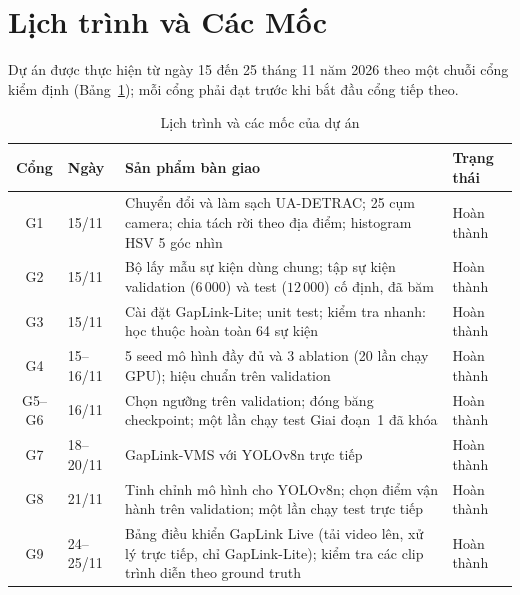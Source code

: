 \section{Lịch trình và Các Mốc}
\label{sec:schedule_milestones}

Dự án được thực hiện từ ngày 15 đến 25 tháng 11 năm 2026 theo một chuỗi cổng kiểm định (Bảng~\ref{tab:milestones}); mỗi cổng phải đạt trước khi bắt đầu cổng tiếp theo.

\begin{table}[H]
    \centering
    \caption{Lịch trình và các mốc của dự án}
    \label{tab:milestones}
    \small
    \begin{tabularx}{\textwidth}{c p{1.6cm} X p{1.9cm}}
        \toprule
        \textbf{Cổng} & \textbf{Ngày} & \textbf{Sản phẩm bàn giao} & \textbf{Trạng thái} \\
        \midrule
        G1 & 15/11 & Chuyển đổi và làm sạch UA-DETRAC; 25 cụm camera; chia tách rời theo địa điểm; histogram HSV 5 góc nhìn & Hoàn thành \\
        G2 & 15/11 & Bộ lấy mẫu sự kiện dùng chung; tập sự kiện validation ($6\,000$) và test ($12\,000$) cố định, đã băm & Hoàn thành \\
        G3 & 15/11 & Cài đặt GapLink-Lite; unit test; kiểm tra nhanh: học thuộc hoàn toàn 64 sự kiện & Hoàn thành \\
        G4 & 15--16/11 & 5 seed mô hình đầy đủ và 3 ablation (20 lần chạy GPU); hiệu chuẩn trên validation & Hoàn thành \\
        G5--G6 & 16/11 & Chọn ngưỡng trên validation; đóng băng checkpoint; một lần chạy test Giai đoạn~1 đã khóa & Hoàn thành \\
        G7 & 18--20/11 & GapLink-VMS với YOLOv8n trực tiếp & Hoàn thành \\
        G8 & 21/11 & Tinh chỉnh mô hình cho YOLOv8n; chọn điểm vận hành trên validation; một lần chạy test trực tiếp & Hoàn thành \\
        G9 & 24--25/11 & Bảng điều khiển GapLink Live (tải video lên, xử lý trực tiếp, chỉ GapLink-Lite); kiểm tra các clip trình diễn theo ground truth & Hoàn thành \\
        \bottomrule
    \end{tabularx}
\end{table}
